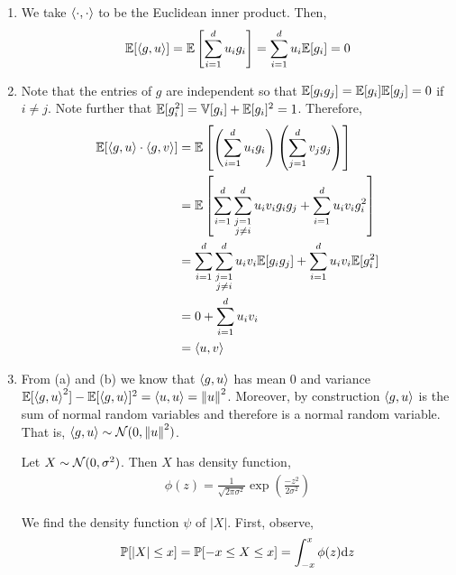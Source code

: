 \documentclass[10pt]{article}
\begin{document}
\begin{solution}[Solution]
\begin{enumerate}[label=(\alph*)]
    \item We take \( \left\langle \cdot,\cdot \right\rangle \) to be the Euclidean inner product. Then,
        \begin{align*}
            \mathbb{E}[\left\langle g,u \right\rangle] 
            =\mathbb{E} \left[ \sum_{i=1}^{d} u_i g_i  \right]
            =\sum_{i=1}^{d} u_i\mathbb{E}[ g_i ]
            = 0
        \end{align*}
        
    \item Note that the entries of \( g \) are independent so that \( \mathbb{E}[g_ig_j] = \mathbb{E}[g_i]\mathbb{E}[g_j] = 0 \) if \( i\neq j \). Note further that \( \mathbb{E}[g_i^2] = \mathbb{V}[g_i] + \mathbb{E}[g_i]^2 = 1 \). Therefore,
        \begin{align*}
            \mathbb{E}[\left\langle g,u \right\rangle\cdot\left\langle g,v \right\rangle] 
            &=\mathbb{E} \left[ \left( \sum_{i=1}^{d} u_i g_i \right) \left( \sum_{j=1}^{d} v_jg_j \right) \right]
            \\&=\mathbb{E} \left[ \sum_{i=1}^{d} \sum_{\substack{j=1 \\j\neq i}}^{d} u_iv_i g_ig_j  + \sum_{i=1}^{d} u_iv_i g_i^2\right] 
            \\&=\sum_{i=1}^{d} \sum_{\substack{j=1 \\j\neq i}}^{d} u_iv_i \mathbb{E}[g_ig_j ] + \sum_{i=1}^{d} u_iv_i \mathbb{E}[g_i^2 ] 
            \\&= 0 + \sum_{i=1}^{d} u_iv_i 
            \\&= \left\langle u,v \right\rangle
        \end{align*}
       
    \item From (a) and (b) we know that \( \left\langle g,u \right\rangle \) has mean 0 and variance \( \mathbb{E}[\left\langle g,u \right\rangle^2]-\mathbb{E}[\left\langle g,u \right\rangle]^2 = \left\langle u,u \right\rangle = \left\lVert u\right\rVert^2 \). Moreover, by construction \( \left\langle g,u \right\rangle \) is the sum of normal random variables and therefore is a normal random variable. That is, \( \left\langle g,u \right\rangle \sim \mathcal{N}(0,\left\lVert u\right\rVert^2)  \).
        
        Let \( X\sim \mathcal{N}(0,\sigma^2) \). Then \( X \) has density function,
        \begin{align*}
            \phi(z) = \frac{1}{\sqrt{2\pi \sigma^2}} \exp \left( \frac{-z^2}{2\sigma^2} \right)
        \end{align*}

        We find the density function \( \psi \) of \( |X| \). First, observe,
        \begin{align*}
            \mathbb{P}[ |X| \leq x] = \mathbb{P}[-x \leq X \leq x] 
            = \int_{-x}^{x} \phi(z) \mathrm{d} z 
        \end{align*}
        

\end{enumerate}
\end{solution}
\end{document}
